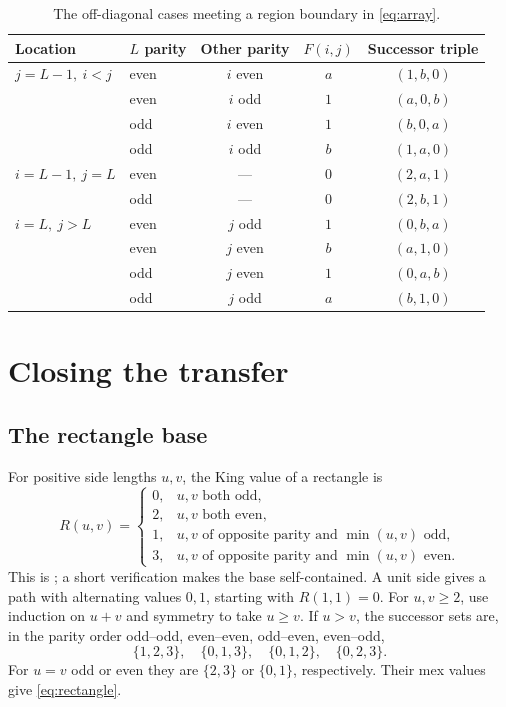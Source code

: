 \documentclass[11pt]{article}
\theoremstyle{remark}
\begin{document}
\begin{table}[tb]
\centering
\caption{The off-diagonal cases meeting a region boundary in
\eqref{eq:array}.}\label{tab:seams}
\begin{tabular}{llccc}
\toprule
Location&$L$ parity&Other parity&$F(i,j)$&Successor triple\\
\midrule
$j=L-1,\ i<j$&even&$i$ even&$a$&$(1,b,0)$\\
&even&$i$ odd&$1$&$(a,0,b)$\\
&odd&$i$ even&$1$&$(b,0,a)$\\
&odd&$i$ odd&$b$&$(1,a,0)$\\
\midrule
$i=L-1,\ j=L$&even&---&$0$&$(2,a,1)$\\
&odd&---&$0$&$(2,b,1)$\\
\midrule
$i=L,\ j>L$&even&$j$ odd&$1$&$(0,b,a)$\\
&even&$j$ even&$b$&$(a,1,0)$\\
&odd&$j$ even&$1$&$(0,a,b)$\\
&odd&$j$ odd&$a$&$(b,1,0)$\\
\bottomrule
\end{tabular}
\end{table}

\section{Closing the transfer}

\subsection*{The rectangle base}
For positive side lengths $u,v$, the King value of a rectangle is
\begin{equation}\label{eq:rectangle}
 R(u,v)=
 \begin{cases}
 0,&u,v\text{ both odd},\\
 2,&u,v\text{ both even},\\
 1,&u,v\text{ of opposite parity and }\min(u,v)\text{ odd},\\
 3,&u,v\text{ of opposite parity and }\min(u,v)\text{ even}.
 \end{cases}
\end{equation}
This is \cite[Theorem 3.8]{gkm2025}; a short verification makes the
base self-contained. A unit side gives a path with alternating values
$0,1$, starting with $R(1,1)=0$. For $u,v\geq2$, use induction on
$u+v$ and symmetry to take $u\geq v$. If $u>v$, the successor sets
are, in the parity order odd--odd, even--even, odd--even, even--odd,
\[
 \{1,2,3\},\quad\{0,1,3\},\quad\{0,1,2\},\quad\{0,2,3\}.
\]
For $u=v$ odd or even they are $\{2,3\}$ or $\{0,1\}$,
respectively. Their mex values give \eqref{eq:rectangle}.
\end{document}
